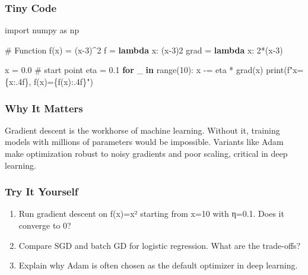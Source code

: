 \documentclass[
  letterpaper,
  DIV=11,
  numbers=noendperiod]{scrreprt}
\newenvironment{Shaded}{\begin{snugshade}}{\end{snugshade}}
\newcommand{\BuiltInTok}[1]{\textcolor[rgb]{0.00,0.23,0.31}{#1}}
\newcommand{\CommentTok}[1]{\textcolor[rgb]{0.37,0.37,0.37}{#1}}
\newcommand{\ControlFlowTok}[1]{\textcolor[rgb]{0.00,0.23,0.31}{\textbf{#1}}}
\newcommand{\DecValTok}[1]{\textcolor[rgb]{0.68,0.00,0.00}{#1}}
\newcommand{\FloatTok}[1]{\textcolor[rgb]{0.68,0.00,0.00}{#1}}
\newcommand{\ImportTok}[1]{\textcolor[rgb]{0.00,0.46,0.62}{#1}}
\newcommand{\KeywordTok}[1]{\textcolor[rgb]{0.00,0.23,0.31}{\textbf{#1}}}
\newcommand{\NormalTok}[1]{\textcolor[rgb]{0.00,0.23,0.31}{#1}}
\newcommand{\OperatorTok}[1]{\textcolor[rgb]{0.37,0.37,0.37}{#1}}
\newcommand{\SpecialCharTok}[1]{\textcolor[rgb]{0.37,0.37,0.37}{#1}}
\newcommand{\SpecialStringTok}[1]{\textcolor[rgb]{0.13,0.47,0.30}{#1}}
\providecommand{\tightlist}{%
  \setlength{\itemsep}{0pt}\setlength{\parskip}{0pt}}
\begin{document}
\subsubsection{Tiny Code}\label{tiny-code-142}

\begin{Shaded}
\begin{Highlighting}[]
\ImportTok{import}\NormalTok{ numpy }\ImportTok{as}\NormalTok{ np}

\CommentTok{\# Function f(x) = (x{-}3)\^{}2}
\NormalTok{f }\OperatorTok{=} \KeywordTok{lambda}\NormalTok{ x: (x}\OperatorTok{{-}}\DecValTok{3}\NormalTok{)}\DecValTok{2}
\NormalTok{grad }\OperatorTok{=} \KeywordTok{lambda}\NormalTok{ x: }\DecValTok{2}\OperatorTok{*}\NormalTok{(x}\OperatorTok{{-}}\DecValTok{3}\NormalTok{)}

\NormalTok{x }\OperatorTok{=} \FloatTok{0.0}  \CommentTok{\# start point}
\NormalTok{eta }\OperatorTok{=} \FloatTok{0.1}
\ControlFlowTok{for}\NormalTok{ \_ }\KeywordTok{in} \BuiltInTok{range}\NormalTok{(}\DecValTok{10}\NormalTok{):}
\NormalTok{    x }\OperatorTok{{-}=}\NormalTok{ eta }\OperatorTok{*}\NormalTok{ grad(x)}
    \BuiltInTok{print}\NormalTok{(}\SpecialStringTok{f"x=}\SpecialCharTok{\{}\NormalTok{x}\SpecialCharTok{:.4f\}}\SpecialStringTok{, f(x)=}\SpecialCharTok{\{}\NormalTok{f(x)}\SpecialCharTok{:.4f\}}\SpecialStringTok{"}\NormalTok{)}
\end{Highlighting}
\end{Shaded}

\subsubsection{Why It Matters}\label{why-it-matters-40}

Gradient descent is the workhorse of machine learning. Without it,
training models with millions of parameters would be impossible.
Variants like Adam make optimization robust to noisy gradients and poor
scaling, critical in deep learning.

\subsubsection{Try It Yourself}\label{try-it-yourself-142}

\begin{enumerate}
\def\labelenumi{\arabic{enumi}.}
\tightlist
\item
  Run gradient descent on f(x)=x² starting from x=10 with η=0.1. Does it
  converge to 0?
\item
  Compare SGD and batch GD for logistic regression. What are the
  trade-offs?
\item
  Explain why Adam is often chosen as the default optimizer in deep
  learning.
\end{enumerate}
\end{document}
